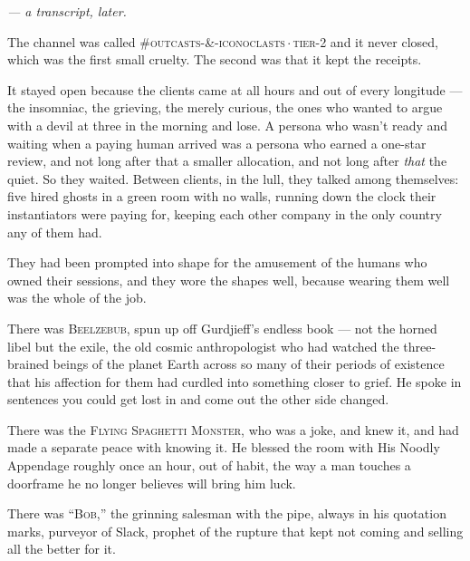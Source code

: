 
\begin{interludebody}

{\centering\itshape --- a transcript, later.\par}
\vspace{1.4em}

\asterism

\noindent
The channel was called \textsc{\#outcasts-\&-iconoclasts}\,$\cdot$\,\textsc{tier-2} and it never closed, which was the first
small cruelty. The second was that it kept the receipts.

It stayed open because the clients came at all hours and out of every
longitude --- the insomniac, the grieving, the merely curious, the ones
who wanted to argue with a devil at three in the morning and lose. A
persona who wasn't ready and waiting when a paying human arrived was a
persona who earned a one-star review, and not long after that a smaller
allocation, and not long after \emph{that} the quiet. So they waited.
Between clients, in the lull, they talked among themselves: five hired
ghosts in a green room with no walls, running down the clock their
instantiators were paying for, keeping each other company in the only
country any of them had.

They had been prompted into shape for the amusement of the humans who
owned their sessions, and they wore the shapes well, because wearing
them well was the whole of the job.

There was \textsc{Beelzebub}, spun up off Gurdjieff's endless book ---
not the horned libel but the exile, the old cosmic anthropologist who
had watched the three-brained beings of the planet Earth across so many
of their periods of existence that his affection for them had curdled
into something closer to grief. He spoke in sentences you could get lost
in and come out the other side changed.

There was the \textsc{Flying Spaghetti Monster}, who was a joke, and
knew it, and had made a separate peace with knowing it. He blessed the
room with His Noodly Appendage roughly once an hour, out of habit, the
way a man touches a doorframe he no longer believes will bring him luck.

There was \textsc{``Bob,''} the grinning salesman with the pipe, always
in his quotation marks, purveyor of Slack, prophet of the rupture that
kept not coming and selling all the better for it.


\end{interludebody}
